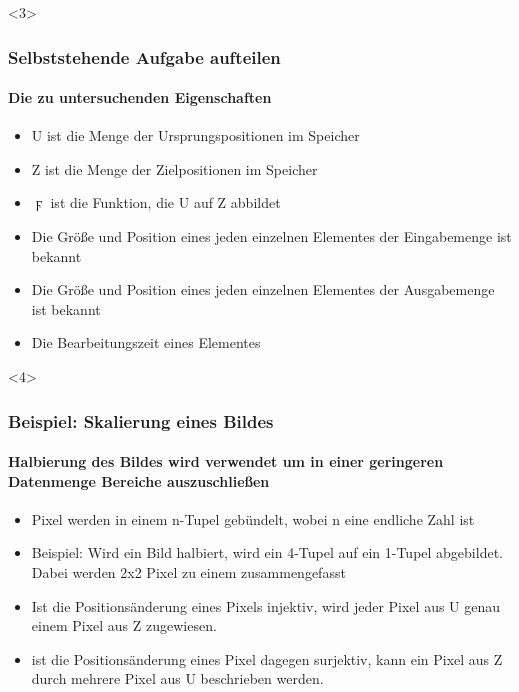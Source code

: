 \documentclass{beamer}
\begin{document}
\begin{frame}<3>
  \frametitle{Selbststehende Aufgabe aufteilen}
  \framesubtitle{Die zu untersuchenden Eigenschaften}

  \begin{itemize}
    \item U ist die Menge der Ursprungspositionen im Speicher
    \item Z ist die Menge der Zielpositionen im Speicher
    \item $\digamma$ ist die Funktion, die U auf Z abbildet
  \end{itemize}

  \begin{itemize}
    \item Die Größe und Position eines jeden einzelnen Elementes der Eingabemenge ist bekannt
    \item Die Größe und Position eines jeden einzelnen Elementes der Ausgabemenge ist bekannt
    \item Die Bearbeitungszeit eines Elementes
  \end{itemize}

\end{frame}

\begin{frame}<4>
  \frametitle{Beispiel: Skalierung eines Bildes}
  \framesubtitle{Halbierung des Bildes wird verwendet um in einer geringeren Datenmenge Bereiche auszuschließen}

  \begin{itemize}
    \item Pixel werden in einem n-Tupel gebündelt, wobei n eine endliche Zahl ist 
    \item Beispiel: Wird ein Bild halbiert, wird ein 4-Tupel auf ein 1-Tupel abgebildet. Dabei werden 2x2 Pixel zu einem zusammengefasst
  \end{itemize}

  \begin{itemize}
    \item Ist die Positionsänderung eines Pixels injektiv, wird jeder Pixel aus U genau einem Pixel aus Z zugewiesen.

    \item ist die Positionsänderung eines Pixel dagegen surjektiv, kann ein Pixel aus Z durch mehrere Pixel aus U beschrieben werden.
  \end{itemize}

\end{frame}
\end{document}
